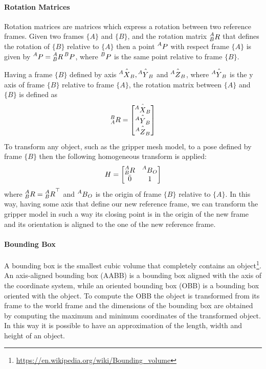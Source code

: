 \paragraph{Rotation Matrices}
Rotation matrices are matrices which express a rotation between two reference frames. Given two frames $\{A\}$ and $\{B\}$, and the rotation matrix $\prescript{A}{B}R$ that defines the rotation of $\{B\}$ relative to $\{A\}$ then a point $\prescript{A}{}P$ with respect frame $\{A\}$ is given by $\prescript{A}{}P=\prescript{A}{B}R\prescript{B}{}P$, where $\prescript{B}{}P$ is the same point relative to frame $\{B\}$. 

Having a frame $\{B\}$ defined by axis $\hat{\prescript{A}{}X_B},\hat{\prescript{A}{}Y_B}$ and $\hat{\prescript{A}{}Z_B}$, where $\hat{\prescript{A}{}Y_B}$ is the y axis of frame $\{B\}$ relative to frame $\{A\}$, the rotation matrix between $\{A\}$ and $\{B\}$ is defined as
\[
\prescript{B}{A}R = 
\begin{bmatrix}
\hat{\prescript{A}{}X_B} \\
\hat{\prescript{A}{}Y_B} \\
\hat{\prescript{A}{}Z_B} \\
\end{bmatrix}
\]
To transform any object, such as the gripper mesh model, to a pose defined by frame $\{B\}$ then the following homogeneous transform is applied:
\[
H = 
\begin{bmatrix}
\prescript{A}{B}R & \prescript{A}{}B_O \\
\bar{0} & 1
\end{bmatrix}
\]
where  $\prescript{A}{B}R={\prescript{A}{B}R}^{\top}$ and $\prescript{A}{}B_O$ is the origin of frame $\{B\}$ relative to $\{A\}$. In this way, having some axis that define our new reference frame, we can transform the gripper model in such a way its closing point is in the origin of the new frame and its orientation is aligned to the one of the new reference frame. 

\paragraph{Bounding Box}
A bounding box is the smallest cubic volume that completely contains an object\footnote{\href{https://en.wikipedia.org/wiki/Bounding_volume}{\url{https://en.wikipedia.org/wiki/Bounding\_volume}}}.
An axis-aligned bounding box (AABB) is a bounding box aligned with the axis of the coordinate system, while an oriented bounding box (OBB) is a bounding box oriented with the object. To compute the OBB the object is transformed from its frame to the world frame and the dimensions of the bounding box are obtained by computing the maximum and minimum coordinates of the transformed object. In this way it is possible to have an approximation of the length, width and height of an object.

